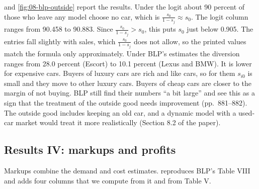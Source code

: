  and \cref{fig:08-blp-outside} report the results. Under the logit about 90
percent of those who leave any model choose no car, which is $\frac{s_0}{1-s_j}\approx s_0$. The logit
column ranges from 90.458 to 90.883. Since $\frac{s_0}{1-s_j} > s_0$, this puts $s_0$ just below 0.905.
The entries fall slightly with sales, which $\frac{s_0}{1-s_j}$ does not allow, so the printed values
match the formula only approximately. Under
BLP's estimates the diversion ranges from 28.0 percent (Escort) to 10.1 percent (Lexus and BMW). It is
lower for expensive cars. Buyers of luxury cars are rich and like cars, so for them $s_{i0}$ is small and
they move to other luxury cars. Buyers of cheap cars are closer to the margin of not buying. BLP still
find their numbers ``a bit large'' and see this as a sign that the treatment of the outside good needs
improvement (pp.~881--882). The outside good includes keeping an old car, and a dynamic model with a
used-car market would treat it more realistically (Section 8.2 of the paper).

\subsection{Results IV: markups and profits}\label{sec:08-blp95-markups}

Markups combine the demand and cost estimates.  reproduces BLP's Table VIII
and adds four columns that we compute from it and from Table V.

